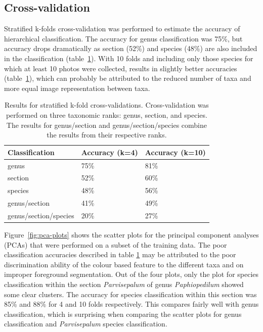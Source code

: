 \documentclass[3p,twocolumn,10pt]{elsarticle}
\begin{document}
\subsection{Cross-validation}

Stratified k-folds cross-validation was performed to estimate the accuracy of hierarchical classification. The accuracy for genus classification was 75\%, but accuracy drops dramatically as section (52\%) and species (48\%) are also included in the classification (table~\ref{tbl:x-validation-results}). With 10 folds and including only those species for which at least 10 photos were collected, results in slightly better accuracies (table~\ref{tbl:x-validation-results}), which can probably be attributed to the reduced number of taxa and more equal image representation between taxa.

\begin{table}[h]\footnotesize
    \caption{Results for stratified k-fold cross-validations. Cross-validation was performed on three taxonomic ranks: genus, section, and species. The results for genus/section and genus/section/species combine the results from their respective ranks.}
    \begin{center}
    \begin{tabular}{lp{1.5cm}p{1.5cm}}
    \toprule
    \textbf{Classification} & \textbf{Accuracy (k=4)} & \textbf{Accuracy (k=10)} \\
    \midrule
    genus                   & 75\%    & 81\% \\
    section                 & 52\%    & 60\% \\
    species                 & 48\%    & 56\% \\
    genus/section           & 41\%    & 49\% \\
    genus/section/species   & 20\%    & 27\% \\
    \bottomrule
    \end{tabular}
    \end{center}
    \label{tbl:x-validation-results}
\end{table}

Figure~\ref{fig:pca-plots} shows the scatter plots for the principal component analyses (PCAs) that were performed on a subset of the training data. The poor classification accuracies described in table \ref{tbl:x-validation-results} may be attributed to the poor discrimination ability of the colour based feature to the different taxa and on improper foreground segmentation. Out of the four plots, only the plot for species classification within the section \textit{Parvisepalum} of genus \textit{Paphiopedilum} showed some clear clusters. The accuracy for species classification within this section was 85\% and 88\% for 4 and 10 folds respectively. This compares fairly well with genus classification, which is surprising when comparing the scatter plots for genus classification and \textit{Parvisepalum} species classification.
\end{document}
